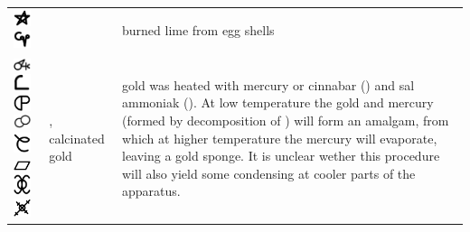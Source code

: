\documentclass[british,final,landscape]{scrartcl}
\begin{document}
\begin{refsection}
\begin{supertabular}{p{0.3\textwidth}p{0.34\textwidth}p{0.34\textwidth}}
   \includegraphics[width=5mm]{Mixtures/CalxOvorum} \includegraphics[width=5mm]{Mixtures/CalxOvorum2} &  & burned lime from egg shells \\
   \includegraphics[width=5mm]{Mixtures/CalcinatedGold} \includegraphics[width=5mm]{Mixtures/CalcinatedGold2} \includegraphics[width=5mm]{Mixtures/CalcinatedGold3} \includegraphics[width=5mm]{Mixtures/CalcinatedGold4} \includegraphics[width=5mm]{Mixtures/CalcinatedGold5} \includegraphics[width=5mm]{Mixtures/CalcinatedGold6} \includegraphics[width=5mm]{Mixtures/CalcinatedGold7} \includegraphics[width=5mm]{Mixtures/CalcinatedGold8} & , calcinated gold & gold was heated with mercury or cinnabar () and sal ammoniak (). At low temperature the gold and mercury (formed by decomposition of ) will form an amalgam, from which at higher temperature the mercury will evaporate, leaving a gold sponge. It is unclear wether this procedure will also yield some  condensing at cooler parts of the apparatus. \\

\end{supertabular}
\end{refsection}
\end{document}
